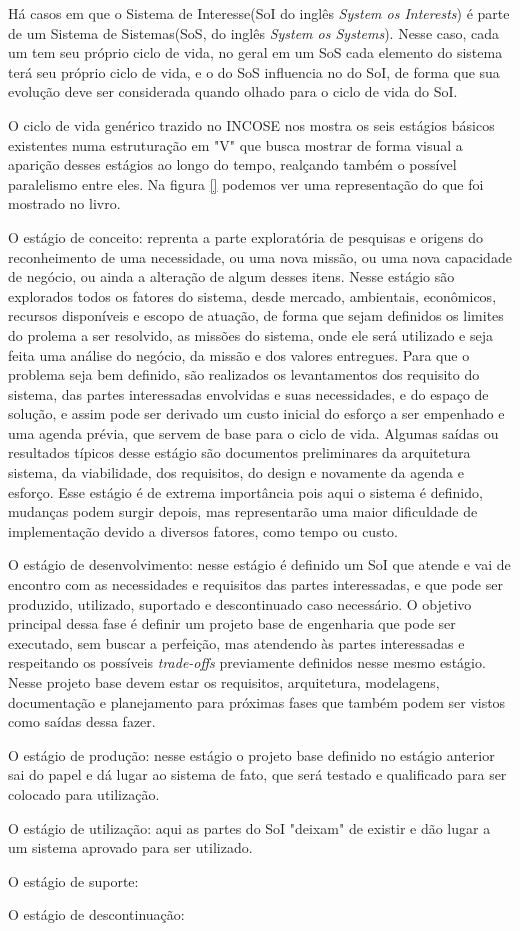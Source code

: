 	Há casos em que o Sistema de Interesse(SoI do inglês \textit{System os Interests}) é parte de um Sistema de Sistemas(SoS, do inglês \textit{System os Systems}). Nesse caso,
	cada um tem seu próprio ciclo de vida, no geral em um SoS cada elemento do sistema terá seu próprio ciclo de vida, e o do SoS influencia no do SoI, de forma
	que sua evolução deve ser considerada quando olhado para o ciclo de vida do SoI.

	O ciclo de vida genérico trazido no INCOSE nos mostra os seis estágios básicos existentes numa estruturação em "V" que busca mostrar de forma visual a aparição desses estágios
	ao longo do tempo, realçando também o possível paralelismo entre eles. Na figura \ref{} podemos ver uma representação do que foi mostrado no livro.

	O estágio de conceito: reprenta a parte exploratória de pesquisas e origens do reconheimento de uma necessidade, ou uma nova missão, ou uma nova capacidade de negócio, ou
	ainda a alteração de algum desses itens. Nesse estágio são explorados todos os fatores do sistema, desde mercado, ambientais, econômicos, recursos disponíveis e escopo de
	atuação, de forma que sejam definidos os limites do prolema a ser resolvido, as missões do sistema, onde ele será utilizado e seja feita uma análise do negócio, da missão e
	dos valores entregues. Para que o problema seja bem definido, são realizados os levantamentos dos requisito do sistema, das partes interessadas envolvidas e suas necessidades,
	e do espaço de solução, e assim pode ser derivado um custo inicial do esforço a ser empenhado e uma agenda prévia, que servem de base para o ciclo de vida. Algumas saídas
	ou resultados típicos desse estágio são documentos preliminares da arquitetura sistema, da viabilidade, dos requisitos, do design e novamente da agenda e esforço. Esse
	estágio é de extrema importância pois aqui o sistema é definido, mudanças podem surgir depois, mas representarão uma maior dificuldade de implementação devido a diversos
	fatores, como tempo ou custo. 

	O estágio de desenvolvimento: nesse estágio é definido um SoI que atende e vai de encontro com as necessidades e requisitos das partes interessadas, e que pode ser
	produzido, utilizado, suportado e descontinuado caso necessário. O objetivo principal dessa fase é definir um projeto base de engenharia que pode ser executado, sem buscar a 
	perfeição, mas atendendo às partes interessadas e respeitando os possíveis \textit{trade-offs} previamente definidos nesse mesmo estágio. Nesse projeto base devem estar os
	requisitos, arquitetura, modelagens, documentação e planejamento para próximas fases que também podem ser vistos como saídas dessa fazer.

	O estágio de produção: nesse estágio o projeto base definido no estágio anterior sai do papel e dá lugar ao sistema de fato, que será testado e qualificado para ser
	colocado para utilização.

	O estágio de utilização: aqui as partes do SoI "deixam" de existir e dão lugar a um sistema aprovado para ser utilizado.

	O estágio de suporte:

	O estágio de descontinuação:


